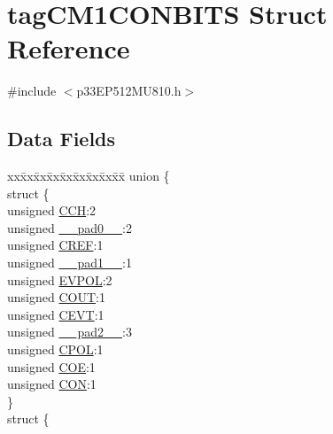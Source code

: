 \hypertarget{structtag_c_m1_c_o_n_b_i_t_s}{}\section{tag\+C\+M1\+C\+O\+N\+B\+I\+TS Struct Reference}
\label{structtag_c_m1_c_o_n_b_i_t_s}


{\ttfamily \#include $<$p33\+E\+P512\+M\+U810.\+h$>$}

\subsection*{Data Fields}
\begin{DoxyCompactItemize}
\item 
\begin{tabbing}
xx\=xx\=xx\=xx\=xx\=xx\=xx\=xx\=xx\=\kill
union \{\\
\>struct \{\\
\>\>unsigned \hyperlink{structtag_c_m1_c_o_n_b_i_t_s_af6a2b157b0f71dea8f43c91f28d471fa}{CCH}:2\\
\>\>unsigned \hyperlink{structtag_c_m1_c_o_n_b_i_t_s_adf71f3d8410c1f1dbbc96680a92c49af}{\_\_pad0\_\_}:2\\
\>\>unsigned \hyperlink{structtag_c_m1_c_o_n_b_i_t_s_a9048d78086e7f5418dbc9fecb8919d03}{CREF}:1\\
\>\>unsigned \hyperlink{structtag_c_m1_c_o_n_b_i_t_s_acaf2d0924a107ec6e8d2e31febaf66f9}{\_\_pad1\_\_}:1\\
\>\>unsigned \hyperlink{structtag_c_m1_c_o_n_b_i_t_s_a22ccc87578ee3feb3e930e91cb3aabde}{EVPOL}:2\\
\>\>unsigned \hyperlink{structtag_c_m1_c_o_n_b_i_t_s_acc4589f929da98d8dbb0e6471091a261}{COUT}:1\\
\>\>unsigned \hyperlink{structtag_c_m1_c_o_n_b_i_t_s_aa7004514fee8eae1195cde3df03f2325}{CEVT}:1\\
\>\>unsigned \hyperlink{structtag_c_m1_c_o_n_b_i_t_s_a4d97cc5f7d51d22fc2bf3eab35c9cb7f}{\_\_pad2\_\_}:3\\
\>\>unsigned \hyperlink{structtag_c_m1_c_o_n_b_i_t_s_a04811054048ff377eded5449c6bdf534}{CPOL}:1\\
\>\>unsigned \hyperlink{structtag_c_m1_c_o_n_b_i_t_s_ad11255870fadb4e9c1faac4645267702}{COE}:1\\
\>\>unsigned \hyperlink{structtag_c_m1_c_o_n_b_i_t_s_a92ce9acc6bbe01ff104c2c8f55101852}{CON}:1\\
\>\} \\
\>struct \{\\

\end{tabbing}
\end{DoxyCompactItemize}
